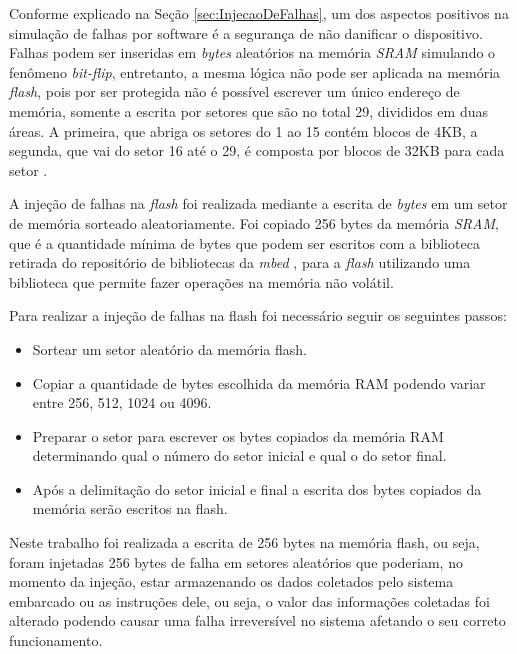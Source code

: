 Conforme explicado na Seção \ref{sec:InjecaoDeFalhas}, um dos aspectos positivos na simulação de falhas por software é a segurança de não danificar o dispositivo. Falhas podem ser inseridas em \textit{bytes} aleatórios na memória \textit{SRAM} simulando o fenômeno \textit{bit-flip}, entretanto, a mesma lógica não pode ser aplicada na memória \textit{flash}, pois por ser protegida não é possível escrever um único endereço de memória, somente a escrita por setores que são no total 29, divididos em duas áreas. A primeira, que abriga os setores do 1 ao 15 contém blocos de 4KB, a segunda, que vai do setor 16 até o 29, é composta por blocos de 32KB para cada setor \cite{manualLpc176x:2016}.

A injeção de falhas na \textit{flash} foi realizada mediante a escrita de \textit{bytes} em um setor de memória sorteado aleatoriamente. Foi copiado 256 bytes da memória \textit{SRAM}, que é a quantidade mínima de bytes que podem ser escritos com a biblioteca retirada do repositório de bibliotecas da \textit{mbed} \cite{escritaNaFlash:2016}, para a \textit{flash} utilizando uma biblioteca que permite fazer operações na memória não volátil. 

Para realizar a injeção de falhas na flash foi necessário seguir os seguintes passos:

\begin{itemize}
	\item Sortear um setor aleatório da memória flash.
	
	\item Copiar a quantidade de bytes escolhida da memória RAM podendo variar entre 256, 512, 1024 ou 4096.
	
	\item Preparar o setor para escrever os bytes copiados da memória RAM determinando qual o número do setor inicial e qual o do setor final.
	
	\item Após a delimitação do setor inicial e final a escrita dos bytes copiados da memória serão escritos na flash.
	
\end{itemize}

Neste trabalho foi realizada a escrita de 256 bytes na memória flash, ou seja, foram injetadas 256 bytes de falha em setores aleatórios que poderiam, no momento da injeção, estar armazenando os dados coletados pelo sistema embarcado ou as instruções dele, ou seja, o valor das informações coletadas foi alterado podendo causar uma falha irreversível no sistema afetando o seu correto funcionamento.

